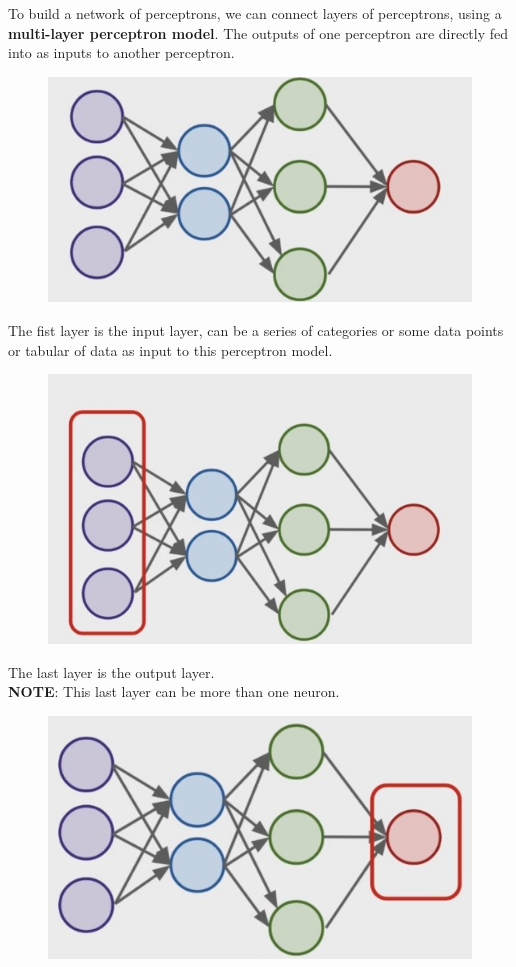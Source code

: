 \documentclass[12pt]{article}
\begin{document}
To build a network of perceptrons, we can connect layers of perceptrons, using a \textbf{multi-layer perceptron model}. The outputs of one perceptron are directly fed into as inputs to another perceptron.
\begin{figure}[htbp]	\centerline{\includegraphics[scale=.5]{img/multiPerceptronModel.jpg}}
\end{figure}

The fist layer is the input layer, can be a series of categories or some data points or tabular of data as input to this perceptron model.
\begin{figure}[htbp]	\centerline{\includegraphics[scale=.5]{img/inputLayer.jpg}}
\end{figure}

The last layer is the output layer.\\
\textbf{NOTE}: This last layer can be more than one neuron.
\begin{figure}[htbp]	\centerline{\includegraphics[scale=.5]{img/outputLayer.jpg}}
\end{figure}
\end{document}
